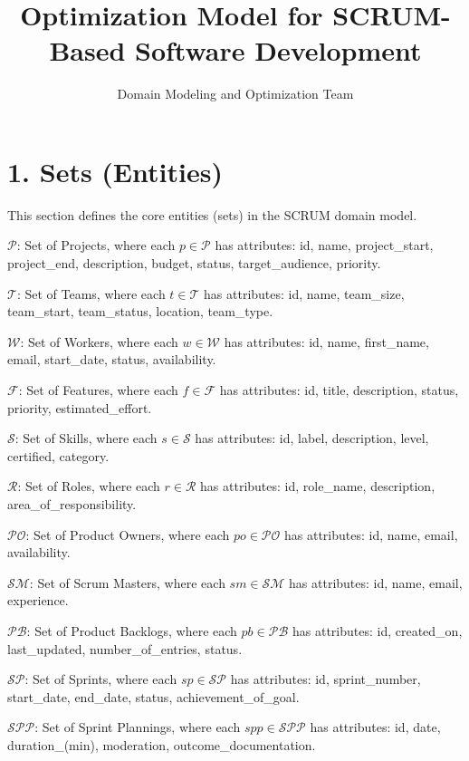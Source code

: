 \documentclass[12pt]{article}
\title{Optimization Model for SCRUM-Based Software Development}
\author{Domain Modeling and Optimization Team}
\date{\DTMtoday}
\begin{document}
\maketitle

\tableofcontents
\newpage

\section{1. Sets (Entities)}

This section defines the core entities (sets) in the SCRUM domain model.

\item $ \mathcal{P} $: Set of Projects, where each $ p \in \mathcal{P} $ has attributes: id, name, project\_start, project\_end, description, budget, status, target\_audience, priority.
    \item $ \mathcal{T} $: Set of Teams, where each $ t \in \mathcal{T} $ has attributes: id, name, team\_size, team\_start, team\_status, location, team\_type.
    \item $ \mathcal{W} $: Set of Workers, where each $ w \in \mathcal{W} $ has attributes: id, name, first\_name, email, start\_date, status, availability.
    \item $ \mathcal{F} $: Set of Features, where each $ f \in \mathcal{F} $ has attributes: id, title, description, status, priority, estimated\_effort.
    \item $ \mathcal{S} $: Set of Skills, where each $ s \in \mathcal{S} $ has attributes: id, label, description, level, certified, category.
    \item $ \mathcal{R} $: Set of Roles, where each $ r \in \mathcal{R} $ has attributes: id, role\_name, description, area\_of\_responsibility.
    \item $ \mathcal{PO} $: Set of Product Owners, where each $ po \in \mathcal{PO} $ has attributes: id, name, email, availability.
    \item $ \mathcal{SM} $: Set of Scrum Masters, where each $ sm \in \mathcal{SM} $ has attributes: id, name, email, experience.
    \item $ \mathcal{PB} $: Set of Product Backlogs, where each $ pb \in \mathcal{PB} $ has attributes: id, created\_on, last\_updated, number\_of\_entries, status.
    \item $ \mathcal{SP} $: Set of Sprints, where each $ sp \in \mathcal{SP} $ has attributes: id, sprint\_number, start\_date, end\_date, status, achievement\_of\_goal.
    \item $ \mathcal{SPP} $: Set of Sprint Plannings, where each $ spp \in \mathcal{SPP} $ has attributes: id, date, duration\_(min), moderation, outcome\_documentation.
\end{document}
